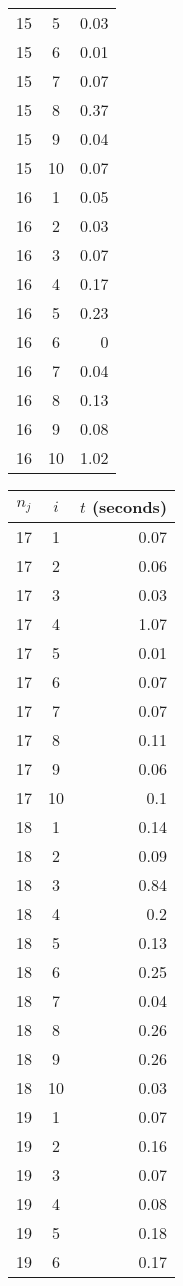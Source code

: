 \documentclass[13pt, letterpaper, oneside]{book}
\begin{document}
\begin{multicols}{5}
\begin{tabular}{c c r}
15 & 5 & 0.03 \\
15 & 6 & 0.01 \\
15 & 7 & 0.07 \\
15 & 8 & 0.37 \\
15 & 9 & 0.04 \\
15 & 10 & 0.07 \\
16 & 1 & 0.05 \\
16 & 2 & 0.03 \\
16 & 3 & 0.07 \\
16 & 4 & 0.17 \\
16 & 5 & 0.23 \\
16 & 6 & 0 \\
16 & 7 & 0.04 \\
16 & 8 & 0.13 \\
16 & 9 & 0.08 \\
16 & 10 & 1.02 \\
\bottomrule
\end{tabular}
\vfill
\columnbreak
\begin{tabular}{c c r}
\toprule
$n_j$ & $i$ & $t$ (seconds) \\
\midrule 
17 & 1 & 0.07 \\
17 & 2 & 0.06 \\
17 & 3 & 0.03 \\
17 & 4 & 1.07 \\
17 & 5 & 0.01 \\
17 & 6 & 0.07 \\
17 & 7 & 0.07 \\
17 & 8 & 0.11 \\
17 & 9 & 0.06 \\
17 & 10 & 0.1 \\
18 & 1 & 0.14 \\
18 & 2 & 0.09 \\
18 & 3 & 0.84 \\
18 & 4 & 0.2 \\
18 & 5 & 0.13 \\
18 & 6 & 0.25 \\
18 & 7 & 0.04 \\
18 & 8 & 0.26 \\
18 & 9 & 0.26 \\
18 & 10 & 0.03 \\
19 & 1 & 0.07 \\
19 & 2 & 0.16 \\
19 & 3 & 0.07 \\
19 & 4 & 0.08 \\
19 & 5 & 0.18 \\
19 & 6 & 0.17 \\

\end{tabular}
\end{multicols}
\end{document}
